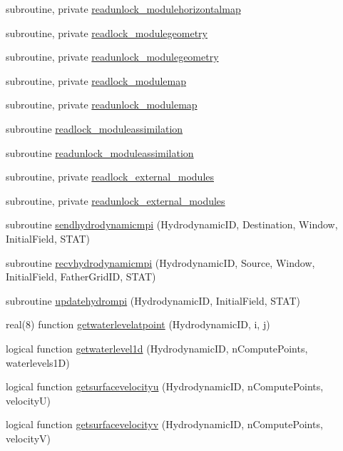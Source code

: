 \begin{DoxyCompactItemize}
\item 
subroutine, private \mbox{\hyperlink{namespacemodulehydrodynamic_af77f71622ac304600bd312437b8af339}{readunlock\+\_\+modulehorizontalmap}}
\item 
subroutine, private \mbox{\hyperlink{namespacemodulehydrodynamic_a1a5e2244778fa6a2caa0ff13ec7eb67b}{readlock\+\_\+modulegeometry}}
\item 
subroutine, private \mbox{\hyperlink{namespacemodulehydrodynamic_a987bae5d3ffa9f3fc96e0dfa2ead01ad}{readunlock\+\_\+modulegeometry}}
\item 
subroutine, private \mbox{\hyperlink{namespacemodulehydrodynamic_aefa0a7b600df8e249667d3541b45ecf1}{readlock\+\_\+modulemap}}
\item 
subroutine, private \mbox{\hyperlink{namespacemodulehydrodynamic_a5265f8f84b5dfafbb654e42da68f00af}{readunlock\+\_\+modulemap}}
\item 
subroutine \mbox{\hyperlink{namespacemodulehydrodynamic_ab5bfdd9c743fefaf135fd907892e5f17}{readlock\+\_\+moduleassimilation}}
\item 
subroutine \mbox{\hyperlink{namespacemodulehydrodynamic_a758de1858d333cb26621ded54ff8be04}{readunlock\+\_\+moduleassimilation}}
\item 
subroutine, private \mbox{\hyperlink{namespacemodulehydrodynamic_a52fe0c61446c7eca188bf5a42867951b}{readlock\+\_\+external\+\_\+modules}}
\item 
subroutine, private \mbox{\hyperlink{namespacemodulehydrodynamic_a6bb278dc4ab8e6429e5d7e752bd6347a}{readunlock\+\_\+external\+\_\+modules}}
\item 
subroutine \mbox{\hyperlink{namespacemodulehydrodynamic_a81c72f539c0330e132af0d9586b8a1b4}{sendhydrodynamicmpi}} (Hydrodynamic\+ID, Destination, Window, Initial\+Field, S\+T\+AT)
\item 
subroutine \mbox{\hyperlink{namespacemodulehydrodynamic_a7093ab7e0b48d35daf4c523567c57d5a}{recvhydrodynamicmpi}} (Hydrodynamic\+ID, Source, Window, Initial\+Field, Father\+Grid\+ID, S\+T\+AT)
\item 
subroutine \mbox{\hyperlink{namespacemodulehydrodynamic_a0b6a544e894ede118ad20bf00d80fa39}{updatehydrompi}} (Hydrodynamic\+ID, Initial\+Field, S\+T\+AT)
\item 
real(8) function \mbox{\hyperlink{namespacemodulehydrodynamic_aed5f042412115b2fc0605a45374090fc}{getwaterlevelatpoint}} (Hydrodynamic\+ID, i, j)
\item 
logical function \mbox{\hyperlink{namespacemodulehydrodynamic_a904ffc2601f0d353ef41686c0912a17d}{getwaterlevel1d}} (Hydrodynamic\+ID, n\+Compute\+Points, waterlevels1D)
\item 
logical function \mbox{\hyperlink{namespacemodulehydrodynamic_a9b4a77f72b7a93ea81baa40e63f809a2}{getsurfacevelocityu}} (Hydrodynamic\+ID, n\+Compute\+Points, velocityU)
\item 
logical function \mbox{\hyperlink{namespacemodulehydrodynamic_a7b33d38f90e3b125d5fe454fd30c25b9}{getsurfacevelocityv}} (Hydrodynamic\+ID, n\+Compute\+Points, velocityV)
\end{DoxyCompactItemize}
